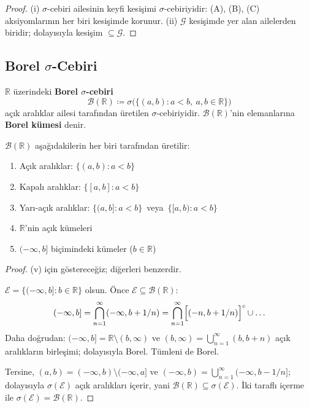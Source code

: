 \begin{proof}
(i) $\sigma$-cebiri ailesinin keyfi kesişimi $\sigma$-cebiriyidir:
(A), (B), (C) aksiyomlarının her biri kesişimde korunur.
(ii) $\mathcal{G}$ kesişimde yer alan ailelerden biridir; dolayısıyla
kesişim $\subseteq \mathcal{G}$.
\end{proof}

\subsection{Borel $\sigma$-Cebiri}

\begin{tanim}\label{def:borel}
$\mathbb{R}$ üzerindeki \textbf{Borel $\sigma$-cebiri}
\[
  \mathcal{B}(\mathbb{R}) \coloneqq \sigma\bigl(\{(a,b) : a < b,\ a,b \in \mathbb{R}\}\bigr)
\]
açık aralıklar ailesi tarafından üretilen $\sigma$-cebiriyidir.
$\mathcal{B}(\mathbb{R})$'nin elemanlarına \textbf{Borel kümesi} denir.
\end{tanim}

\begin{teorem}\label{thm:boreldenk}
$\mathcal{B}(\mathbb{R})$ aşağıdakilerin her biri tarafından üretilir:
\begin{enumerate}[label=(\roman*)]
  \item Açık aralıklar: $\{(a,b) : a<b\}$
  \item Kapalı aralıklar: $\{[a,b] : a<b\}$
  \item Yarı-açık aralıklar: $\{(a,b] : a<b\}$\ veya\ $\{[a,b) : a<b\}$
  \item $\mathbb{R}$'nin açık kümeleri
  \item $(-\infty, b]$ biçimindeki kümeler ($b \in \mathbb{R}$)
\end{enumerate}
\end{teorem}

\begin{proof}
(v) için göstereceğiz; diğerleri benzerdir.

$\mathcal{E} = \{(-\infty, b] : b \in \mathbb{R}\}$ olsun. Önce $\mathcal{E} \subseteq \mathcal{B}(\mathbb{R})$:
\[
  (-\infty, b] = \bigcap_{n=1}^\infty (-\infty, b + 1/n)
  = \bigcap_{n=1}^\infty \Bigl[(-n, b+1/n)\Bigr]^c \cup \ldots
\]
Daha doğrudan: $(-\infty, b] = \mathbb{R} \setminus (b, \infty)$ ve
$(b,\infty) = \bigcup_{n=1}^\infty (b, b+n)$ açık aralıkların birleşimi;
dolayısıyla Borel. Tümleni de Borel.

Tersine, $(a,b) = (-\infty, b) \setminus (-\infty, a]$ ve
$(-\infty, b) = \bigcup_{n=1}^\infty (-\infty, b - 1/n]$; dolayısıyla
$\sigma(\mathcal{E})$ açık aralıkları içerir, yani $\mathcal{B}(\mathbb{R}) \subseteq \sigma(\mathcal{E})$.
İki taraflı içerme ile $\sigma(\mathcal{E}) = \mathcal{B}(\mathbb{R})$.
\end{proof}

